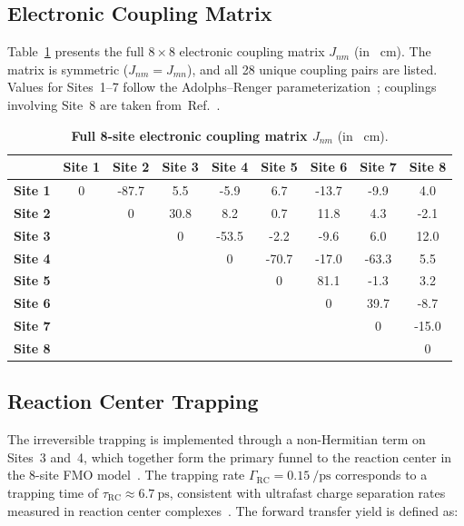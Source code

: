 \documentclass[11pt,a4paper]{article}
\begin{document}
\subsection{Electronic Coupling Matrix}

Table~\ref{tab:SI_coupling_matrix} presents the full $8\times8$ electronic coupling matrix $J_{nm}$ (in \si{\per\cm}).
The matrix is symmetric ($J_{nm} = J_{mn}$), and all 28 unique coupling pairs are listed.
Values for Sites~1--7 follow the Adolphs--Renger parameterization~\cite{Adolphs2006}; couplings involving Site~8 are taken from~Ref.~\cite{Moix2011}.

\begin{table}[htbp]
\centering
\caption{\textbf{Full 8-site electronic coupling matrix $J_{nm}$} (in \si{\per\cm}).}
\label{tab:SI_coupling_matrix}
\begin{tabular}{lcccccccc}
\toprule
 & \textbf{Site 1} & \textbf{Site 2} & \textbf{Site 3} & \textbf{Site 4} & \textbf{Site 5} & \textbf{Site 6} & \textbf{Site 7} & \textbf{Site 8} \\
\midrule
\textbf{Site 1} & 0 & -87.7 & 5.5  & -5.9 & 6.7  & -13.7 & -9.9 & 4.0 \\
\textbf{Site 2} &   & 0     & 30.8 & 8.2  & 0.7  & 11.8  & 4.3  & -2.1 \\
\textbf{Site 3} &   &       & 0    & -53.5 & -2.2 & -9.6  & 6.0  & 12.0 \\
\textbf{Site 4} &   &       &      & 0    & -70.7 & -17.0 & -63.3 & 5.5 \\
\textbf{Site 5} &   &       &      &      & 0    & 81.1  & -1.3 & 3.2 \\
\textbf{Site 6} &   &       &      &      &      & 0     & 39.7 & -8.7 \\
\textbf{Site 7} &   &       &      &      &      &       & 0    & -15.0 \\
\textbf{Site 8} &   &       &      &      &      &       &      & 0 \\
\bottomrule
\end{tabular}
\end{table}

\subsection{Reaction Center Trapping}

The irreversible trapping is implemented through a non-Hermitian term on Sites~3 and~4, which together form the primary funnel to the reaction center in the 8-site FMO model~\cite{Renger2003,Moix2011}.
The trapping rate $\Gamma_{\mathrm{RC}} = \SI{0.15}{\per\ps}$ corresponds to a trapping time of $\tau_{\mathrm{RC}} \approx \SI{6.7}{\ps}$, consistent with ultrafast charge separation rates measured in reaction center complexes~\cite{Renger2003}.
The forward transfer yield is defined as:
\end{document}

